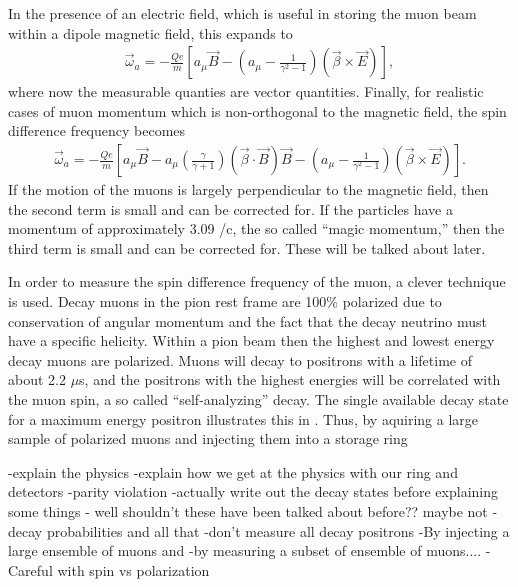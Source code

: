 \clearpage



In the presence of an electric field, which is useful in storing the muon beam within a dipole magnetic field, this expands to 
        \begin{align} \label{eq:waelectric}
            \vec{\omega}_{a} = -\frac{Qe}{m} [a_{\mu}\vec{B} - (a_{\mu} - \frac{1}{\gamma^{2}-1})(\vec{\beta} \times \vec{E}) ],
        \end{align}
where now the measurable quanties are vector quantities. Finally, for realistic cases of muon momentum which is non-orthogonal to the magnetic field, the spin difference frequency becomes
        \begin{align} \label{eq:wafinal}
            \vec{\omega}_{a} = -\frac{Qe}{m} [a_{\mu}\vec{B} - a_{\mu} (\frac{\gamma}{\gamma+1})(\vec{\beta} \cdot \vec{B})\vec{B} - (a_{\mu} - \frac{1}{\gamma^{2}-1})(\vec{\beta} \times \vec{E}) ].
        \end{align}
If the motion of the muons is largely perpendicular to the magnetic field, then the second term is small and can be corrected for. If the particles have a momentum of approximately 3.09 \GeV/c, the so called ``magic momentum,'' then the third term is small and can be corrected for. These will be talked about later.

In order to measure the spin difference frequency of the muon, a clever technique is used. Decay muons in the pion rest frame are 100\% polarized due to conservation of angular momentum and the fact that the decay neutrino must have a specific helicity. Within a pion beam then the highest and lowest energy decay muons are polarized. Muons will decay to positrons with a lifetime of about 2.2 $\mu$s, and the positrons with the highest energies will be correlated with the muon spin, a so called ``self-analyzing'' decay. The single available decay state for a maximum energy positron illustrates this in . Thus, by aquiring a large sample of polarized muons and injecting them into a storage ring 








-explain the physics
-explain how we get at the physics with our ring and detectors
-parity violation
-actually write out the decay states before explaining some things - well shouldn't these have been talked about before?? maybe not
-decay probabilities and all that
-don't measure all decay positrons
-By injecting a large ensemble of muons and 
-by measuring a subset of ensemble of muons....
-Careful with spin vs polarization





